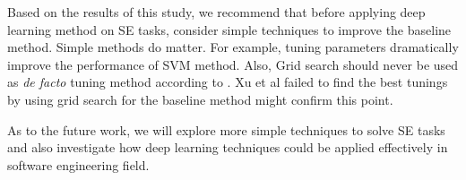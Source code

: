 \documentclass[sigconf,review, anonymous]{acmart}
\theoremstyle{break}
\begin{document}
Based on the results of this study, we recommend that before applying 
deep learning method on SE tasks, consider simple techniques to improve the baseline method.
Simple methods do matter. For example, tuning parameters dramatically improve the 
performance of SVM method.  Also, Grid search should
never be used as {\it de facto} tuning method according to \cite{fu2016differential,bergstra2012random}. 
Xu et al failed to find the best tunings by using grid search for
the baseline method might confirm this point.

As to the future work, we will explore more simple techniques to solve SE tasks and also
investigate how deep learning techniques could be applied effectively in software engineering
field. 





 
\end{document}
